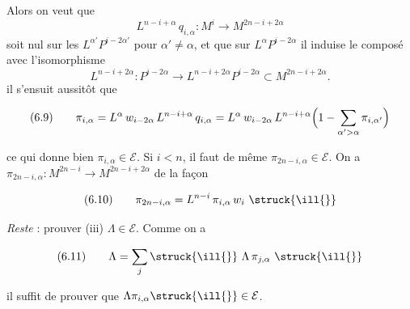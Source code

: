 
Alors on veut que
\[ L^{n-i+\alpha}\, q_{i,\alpha} \colon M^{i} \longrightarrow M^{2n-i+2\alpha} \]
soit nul sur les $L^{\alpha'} P^{i-2\alpha'}$ pour $\alpha' \neq \alpha$, et que
sur $L^{\alpha} P^{i-2\alpha}$ il induise \ill{} le composé avec l'isomorphisme
\[ L^{n-i+2\alpha} \colon P^{i-2\alpha} \longrightarrow L^{n-i+2\alpha} P^{i-2\alpha} \subset M^{2n-i+2\alpha} . \]
\ill{} il s'ensuit aussitôt \ill{} que

\[ (6.9) \qquad \pi_{i,\alpha} = L^{\alpha}\, w_{i-2\alpha}\, L^{n-i+\alpha}\, q_{i,\alpha} = L^{\alpha}\, w_{i-2\alpha}\, L^{n-i+\alpha}\Bigl( 1 - \sum_{\alpha' > \alpha} \pi_{i,\alpha'} \Bigr) \]

ce qui donne bien $\pi_{i,\alpha} \in \mathcal{E}$. 
Si $i < n$, il faut de même $\pi_{2n-i,\alpha} \in \mathcal{E}$. \ill{} On a
$\pi_{2n-i,\alpha} \colon M^{2n-i} \to M^{2n-i+2\alpha}$ \ill{} de la façon

\[ (6.10) \qquad \pi_{2n-i,\alpha} = L^{n-i}\, \pi_{i,\alpha}\, w_{i} \ \struck{\ill{}} \]

\emph{Reste} : prouver (iii) $\Lambda \in \mathcal{E}$. Comme on a

\[ (6.11) \qquad \Lambda = \sum_{j} \struck{\ill{}}\ \Lambda\, \pi_{j,\alpha}\ \struck{\ill{}} \]

il suffit de prouver que $\Lambda \pi_{i,\alpha} \struck{\ill{}} \in \mathcal{E}$.

